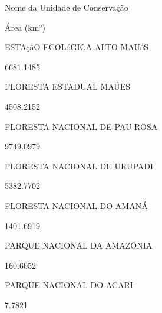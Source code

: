 \documentclass[
  letterpaper,
]{report}
\begin{document}
\n  

\n    

\n      

Nome da Unidade de Conservação

\n      

Área (km²)

\n    

\n  

\n  

\n    

\n      

ESTAçãO ECOLóGICA ALTO MAUéS

\n      

6681.1485

\n    

\n    

\n      

FLORESTA ESTADUAL MAÚES

\n      

4508.2152

\n    

\n    

\n      

FLORESTA NACIONAL DE PAU-ROSA

\n      

9749.0979

\n    

\n    

\n      

FLORESTA NACIONAL DE URUPADI

\n      

5382.7702

\n    

\n    

\n      

FLORESTA NACIONAL DO AMANÁ

\n      

1401.6919

\n    

\n    

\n      

PARQUE NACIONAL DA AMAZÔNIA

\n      

160.6052

\n    

\n    

\n      

PARQUE NACIONAL DO ACARI

\n      

7.7821
\end{document}
